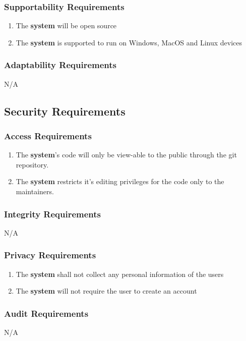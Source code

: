 \documentclass[12pt, titlepage]{article}
\begin{document}
    \subsubsection{Supportability Requirements}
        \begin{enumerate}
            \item The \textbf{system} will be open source
            \item The \textbf{system} is supported to run on Windows, MacOS and Linux devices
        \end{enumerate}
    \subsubsection{Adaptability Requirements}
        N/A

\subsection{Security Requirements}
    \subsubsection{Access Requirements}
        \begin{enumerate}
            \item The \textbf{system}'s code will only be view-able to the public through the git repository. 
            \item The \textbf{system} restricts it's editing privileges for the code only to the maintainers. 
        \end{enumerate}
    \subsubsection{Integrity Requirements}
        N/A
    \subsubsection{Privacy Requirements}
        \begin{enumerate}
            \item The \textbf{system} shall not collect any personal information of the users 
            \item The \textbf{system} will not require the user to create an account
        \end{enumerate}
    \subsubsection{Audit Requirements}
        N/A
\end{document}
